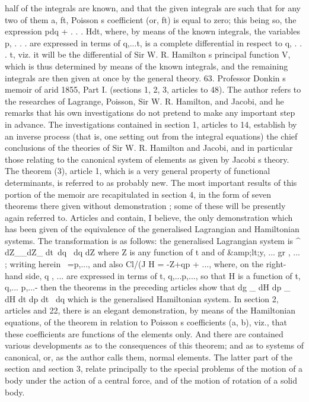\documentclass[11pt,a4paper]{book}
\begin{document}

half
of
the
integrals
are
known,
and
that
the
given
integrals
are
such
that
for
any
two
of
them
a,
ft,
Poisson s
coefficient
(or,
ft)
is
equal
to
zero;
this
being
so,
the
expression pdq +
.
.
.
Hdt, where,
by means
of
the known
integrals,
the
variables
p,
.
.
.
are
expressed
in
terms
of
q,...t,
is
a
complete
differential
in
respect
to
q,
.
.
.
t,
viz.
it
will
be
the
differential
of
Sir
W.
R.
Hamilton s
principal
function
V,
which
is
thus
determined
by
means
of
the
known
integrals,
and
the
remaining
integrals
are
then given
at once by the general
theory.
63.
Professor Donkin s
memoir of
arid
1855, Part
I.
(sections
1,
2,
3,
articles
to
48).
The author
refers
to the researches of Lagrange,
Poisson,
Sir W.
R. Hamilton,
and
Jacobi,
and
he
remarks
that
his
own
investigations
do
not
pretend
to make any
important
step
in
advance.
The
investigations
contained
in
section
1,
articles
to
14,
establish
by an
inverse
process
(that
is,
one
setting
out
from
the
integral
equations)
the
chief
conclusions
of
the
theories
of
Sir W.
R.
Hamilton
and
Jacobi,
and
in
particular
those
relating
to
the
canonical
system
of
elements
as
given
by
Jacobi s
theory.
The
theorem
(3),
article
1,
which
is
a
very
general
property
of
functional
determinants,
is referred
to
as probably
new.
The most important
results
of this portion
of
the
memoir
are
recapitulated
in
section
4,
in
the
form
of
seven
theorems
there
given without demonstration
;
some
of these
will be presently again
referred
to.
Articles
and
contain,
I
believe,
the
only
demonstration
which
has
been
given
of
the
equivalence of the
generalised Lagrangian and Hamiltonian systems.
The transformation
is as follows:
the generalised Lagrangian
system
is
^ dZ__dZ_
dt~dq ~dq
dZ
where Z
is
any
function
of
t
and
of
\&amp;lt;y,
...
gr
, ...
;
writing
herein ~=p,..., and
also
Cl/(J
H = -Z+qp + ...,
where,
on
the
right-hand
side,
q
,
...
are
expressed
in
terms
of
t,
q,...p,...,
so
that H
is
a
function
of
t,
q,...
p,...-
then
the
theorems
in
the
preceding
articles show that
dg _ dH
dp _
dH
dt
dp
dt~
dq
which
is the generalised Hamiltonian system.
In
section
2,
articles
and
22, there
is
an
elegant
demonstration, by means
of
the
Hamiltonian
equations,
of
the
theorem
in
relation
to
Poisson s
coefficients
(a,
b),
viz.,
that
these
coefficients
are
functions
of the elements
only.
And
there are contained
various
developments
as
to
the
consequences
of
this
theorem;
and
as
to
systems
of
canonical,
or,
as
the
author
calls
them,
normal
elements.
The
latter
part
of
the
section
and
section
3,
relate
principally
to
the
special
problems
of
the
motion
of
a
body under the action of a central
force, and
of the motion
of rotation
of a
solid body.
\end{document}
